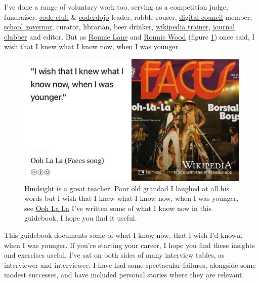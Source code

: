\documentclass[
]{book}
\begin{document}
I've done a range of voluntary work too, serving as a competition judge, fundraiser, \href{https://codeclub.org}{code club} \& \href{https://coderdojo.com}{coderdojo} leader, rabble rouser, \href{https://www.manchesterdigital.com/}{digital council} member, \href{https://governorsforschools.org.uk/}{school governor}, curator, librarian, beer drinker, \href{https://wiki-loves-scientists.org.uk/}{wikipedia trainer}, \href{https://sigcse.cs.manchester.ac.uk/}{journal clubber} and editor. But as \href{https://en.wikipedia.org/wiki/Ronnie_Lane}{Ronnie Lane} and \href{https://en.wikipedia.org/wiki/Ronnie_Wood}{Ronnie Wood} (figure \ref{fig:faces-fig}) once said, I wish that I knew what I know now, when I was younger.

\begin{figure}

{\centering \includegraphics[width=0.99\linewidth]{images/faces} 

}

\caption{Hindsight is a great teacher. Poor old grandad I laughed at all his words but I wish that I knew what I know now, when I was younger, see \href{https://en.wikipedia.org/wiki/Ooh_La_La_(Faces_song)}{Ooh La La} \citep{faces} I've written some of what I know now in this guidebook, I hope you find it useful.}\label{fig:faces-fig}
\end{figure}



This guidebook documents some of what I know now, that I wish I'd known, when I was younger. If you're starting your career, I hope you find these insights and exercises useful. I've sat on both sides of many interview tables, as interviewer and interviewee. I have had some spectacular failures, alongside some modest successes, and have included personal stories where they are relevant.
\end{document}

